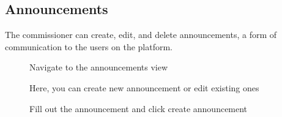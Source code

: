 \documentclass{article}
\begin{document}
\subsection{Announcements}
The commissioner can create, edit, and delete announcements, a form of communication to the users on the platform.

\begin{figure}[H]
    \centering
    \caption{Navigate to the announcements view}
\end{figure}

\begin{figure}[H]
    \centering
    \caption{Here, you can create new announcement or edit existing ones}
\end{figure}

\begin{figure}[H]
    \centering
    \caption{Fill out the announcement and click create announcement}
\end{figure}
\end{document}
